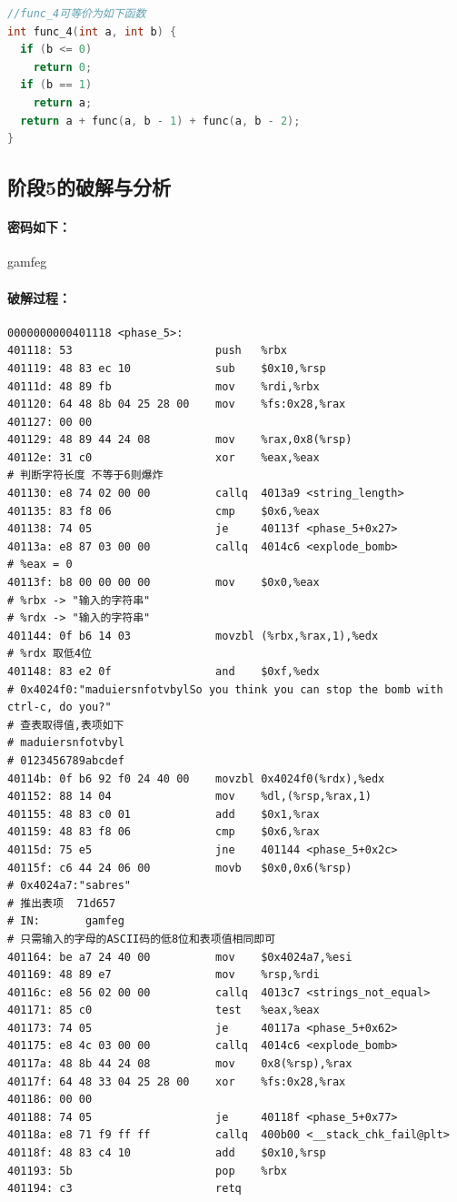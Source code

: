 \begin{lstlisting}[language = c]
//func_4可等价为如下函数
int func_4(int a, int b) {
  if (b <= 0)
    return 0;
  if (b == 1)
    return a;
  return a + func(a, b - 1) + func(a, b - 2);
}
\end{lstlisting}


\subsection{阶段5的破解与分析}

\paragraph{密码如下：}gamfeg

\paragraph{破解过程：}

\begin{lstlisting}
0000000000401118 <phase_5>:
401118:	53                   	push   %rbx
401119:	48 83 ec 10          	sub    $0x10,%rsp
40111d:	48 89 fb             	mov    %rdi,%rbx
401120:	64 48 8b 04 25 28 00 	mov    %fs:0x28,%rax
401127:	00 00 
401129:	48 89 44 24 08       	mov    %rax,0x8(%rsp)
40112e:	31 c0                	xor    %eax,%eax
# 判断字符长度 不等于6则爆炸
401130:	e8 74 02 00 00       	callq  4013a9 <string_length>
401135:	83 f8 06             	cmp    $0x6,%eax
401138:	74 05                	je     40113f <phase_5+0x27>
40113a:	e8 87 03 00 00       	callq  4014c6 <explode_bomb>
# %eax = 0
40113f:	b8 00 00 00 00       	mov    $0x0,%eax
# %rbx -> "输入的字符串"
# %rdx -> "输入的字符串"
401144:	0f b6 14 03          	movzbl (%rbx,%rax,1),%edx
# %rdx 取低4位
401148:	83 e2 0f             	and    $0xf,%edx
# 0x4024f0:"maduiersnfotvbylSo you think you can stop the bomb with ctrl-c, do you?"
# 查表取得值,表项如下
# maduiersnfotvbyl
# 0123456789abcdef
40114b:	0f b6 92 f0 24 40 00 	movzbl 0x4024f0(%rdx),%edx
401152:	88 14 04             	mov    %dl,(%rsp,%rax,1)
401155:	48 83 c0 01          	add    $0x1,%rax
401159:	48 83 f8 06          	cmp    $0x6,%rax
40115d:	75 e5                	jne    401144 <phase_5+0x2c>
40115f:	c6 44 24 06 00       	movb   $0x0,0x6(%rsp)
# 0x4024a7:"sabres"
# 推出表项  71d657
# IN:       gamfeg
# 只需输入的字母的ASCII码的低8位和表项值相同即可
401164:	be a7 24 40 00       	mov    $0x4024a7,%esi
401169:	48 89 e7             	mov    %rsp,%rdi
40116c:	e8 56 02 00 00       	callq  4013c7 <strings_not_equal>
401171:	85 c0                	test   %eax,%eax
401173:	74 05                	je     40117a <phase_5+0x62>
401175:	e8 4c 03 00 00       	callq  4014c6 <explode_bomb>
40117a:	48 8b 44 24 08       	mov    0x8(%rsp),%rax
40117f:	64 48 33 04 25 28 00 	xor    %fs:0x28,%rax
401186:	00 00 
401188:	74 05                	je     40118f <phase_5+0x77>
40118a:	e8 71 f9 ff ff       	callq  400b00 <__stack_chk_fail@plt>
40118f:	48 83 c4 10          	add    $0x10,%rsp
401193:	5b                   	pop    %rbx
401194:	c3                   	retq   
\end{lstlisting}

